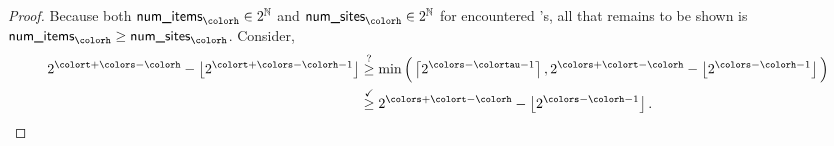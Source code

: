 \begin{proof}
Because both $\textsf{num\_items}_{\colorh} \in 2^{\mathbb{N}}$ and $\textsf{num\_sites}_{\colorh} \in 2^{\mathbb{N}}$ for encountered \hv{}'s, all that remains to be shown is $\textsf{num\_items}_{\colorh} \geq \textsf{num\_sites}_{\colorh}$.
Consider,
\begin{align*}
2^{\colort + \colors - \colorh} - \left\lfloor2^{\colort + \colors - \colorh - 1} \right\rfloor
&\stackrel{?}{\geq}
\min\Big(
\left\lceil 2^{\colors - \colortau - 1} \right\rceil,
2^{\colors + \colort - \colorh} - \left\lfloor 2^{\colors - \colorh - 1} \right\rfloor
\Big)\\
&\stackrel{\checkmark}{\geq}
2^{\colors + \colort - \colorh} - \left\lfloor 2^{\colors - \colorh - 1} \right\rfloor.
\end{align*}
\end{proof}
